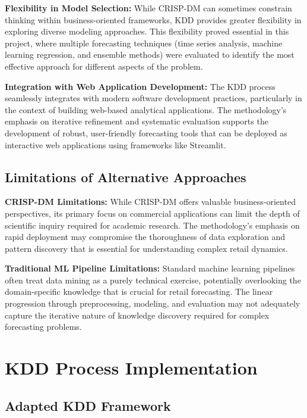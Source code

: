 \textbf{Flexibility in Model Selection:} While CRISP-DM can sometimes constrain thinking within business-oriented frameworks, KDD provides greater flexibility in exploring diverse modeling approaches. This flexibility proved essential in this project, where multiple forecasting techniques (time series analysis, machine learning regression, and ensemble methods) were evaluated to identify the most effective approach for different aspects of the problem.

\textbf{Integration with Web Application Development:} The KDD process seamlessly integrates with modern software development practices, particularly in the context of building web-based analytical applications. The methodology's emphasis on iterative refinement and systematic evaluation supports the development of robust, user-friendly forecasting tools that can be deployed as interactive web applications using frameworks like Streamlit.

\subsection{Limitations of Alternative Approaches}
\label{subsec:alternative_limitations}

\textbf{CRISP-DM Limitations:} While CRISP-DM offers valuable business-oriented perspectives, its primary focus on commercial applications can limit the depth of scientific inquiry required for academic research. The methodology's emphasis on rapid deployment may compromise the thoroughness of data exploration and pattern discovery that is essential for understanding complex retail dynamics.

\textbf{Traditional ML Pipeline Limitations:} Standard machine learning pipelines often treat data mining as a purely technical exercise, potentially overlooking the domain-specific knowledge that is crucial for retail forecasting. The linear progression through preprocessing, modeling, and evaluation may not adequately capture the iterative nature of knowledge discovery required for complex forecasting problems.

\section{KDD Process Implementation}
\label{sec:kdd_implementation}

\subsection{Adapted KDD Framework}
\label{subsec:adapted_kdd}

